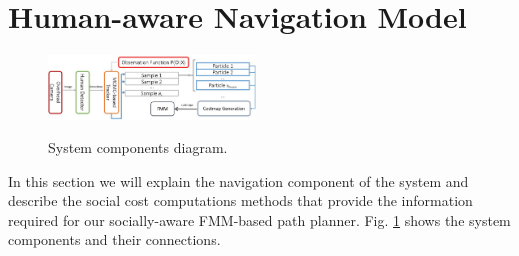 \section{Human-aware Navigation Model}
\label{social_nav}



\begin{figure}
\centering
{\includegraphics[width=0.49\textwidth]{pictures/block.jpg}}
\caption{System components diagram.}
\label{fig:block}
\end{figure}


In this section we will explain the navigation component of the system and describe the social cost computations methods that provide the information required for our socially-aware FMM-based path planner. Fig. \ref{fig:block} shows the system components and their connections.



